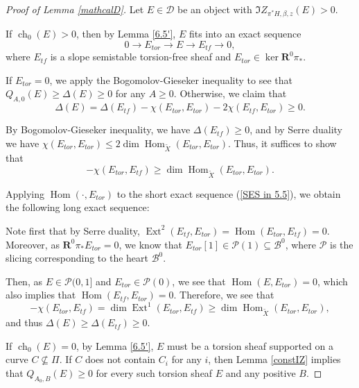 \documentclass[12pt]{amsart}
\theoremstyle{definition}
\DeclareMathOperator{\Hom}{Hom}
\DeclareMathOperator{\Ext}{Ext}
\DeclareMathOperator{\ch}{ch}
\begin{document}
\begin{proof}[Proof of Lemma \ref{mathcalD}]
Let $E\in \mathcal{D}$ be an  object with $\Im Z_{\pi^\ast H,\beta,z}(E)>0$.

If $\ch_0(E) >0$, then by Lemma \ref{6.5'}, $E$ fits into an exact sequence
\begin{equation}\label{SES in 5.5}
0 \longrightarrow E_{tor} \longrightarrow E\longrightarrow E_{tf} \longrightarrow 0,
\end{equation}
where $E_{tf}$ is a slope semistable torsion-free sheaf and $E_{tor} \in \ker \mathbf{R}^0\pi_\ast$.

If $E_{tor} = 0$, we apply the Bogomolov-Gieseker inequality to see that $Q_{A,0}(E) \geq \Delta(E) \geq 0$ for any $A \geq 0$. 
Otherwise, we claim that $$\Delta(E) 
= \Delta(E_{tf}) -\chi(E_{tor},E_{tor})-2\chi(E_{tf},E_{tor}) \geq 0.$$

By Bogomolov-Gieseker inequality, we have $\Delta(E_{tf})\geq 0$,
and by Serre duality we have $\chi(E_{tor},E_{tor}) \leq 2\dim \Hom_{\widetilde{X}}(E_{tor},E_{tor})$.
Thus, it suffices to show that
\[-\chi(E_{tor},E_{tf}) \geq \dim \Hom_{\widetilde{X}}(E_{tor},E_{tor}).\]

Applying $\Hom(\cdot ,E_{tor})$ to the short exact sequence (\ref{SES in 5.5}), we obtain the following long exact sequence:



Note first that by Serre duality, $\Ext^2(E_{tf},E_{tor})=\Hom(E_{tor},E_{tf})=0$.
Moreover, as $\mathbf{R}^0\pi_\ast E_{tor}=0$, we know that $E_{tor}[1] \in \mathcal{P}(1) \subseteq \mathcal{B}^0$, where $\mathcal{P}$ is the slicing corresponding to the heart $\mathcal{B}^0$.

Then, as $E \in \mathcal{P}(0,1]$ and $E_{tor} \in \mathcal{P}(0)$, we see that $\Hom(E,E_{tor})=0$, 
which also implies that $\Hom(E_{tf},E_{tor})=0$.
Therefore, we see that
$$-\chi(E_{tor},E_{tf})= \dim \Ext^1(E_{tor},E_{tf}) \geq \dim \Hom_{\widetilde{X}}(E_{tor},E_{tor}),$$
and thus $\Delta(E) \geq \Delta(E_{tf})\geq0.$


If $\ch_0(E)=0$, by Lemma \ref{6.5'}, $E$ must be a torsion sheaf supported on a curve $C \nsubseteq \Pi$.
If $C$ does not contain $C_i$ for any $i$,
then Lemma \ref{constIZ} implies that $Q_{A_0,B}(E) \geq 0$ for every such torsion sheaf $E$ and any positive $B$.


\end{proof}
\end{document}
